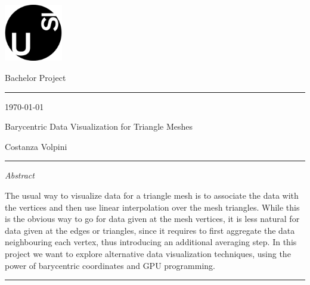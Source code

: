 \documentclass[12pt]{article}
\theoremstyle{definition}
\theoremstyle{definition}
\theoremstyle{plain}
\theoremstyle{plain}
\theoremstyle{plain}
\theoremstyle{plain}
\theoremstyle{definition}
\theoremstyle{remark}
\theoremstyle{remark}
\theoremstyle{remark}
\theoremstyle{remark}
\newcommand{\SUPERTITLE}{Bachelor Project}
\newcommand{\TITLE}{Barycentric Data Visualization for Triangle Meshes}
\newcommand{\SUBTITLE}{\color{red}{Something}\color{black}}
\newcommand{\AUTHOR}{Costanza Volpini}
\begin{document}

\thispagestyle{empty}

\includegraphics[height=2.5cm]{usi-logo.png} \vspace{-1.42cm}

\begin{flushright}
  {\large \SUPERTITLE}\vspace{-.5cm}

  \rule{0.925\textwidth}{0.4pt}\vspace{-.2cm}

  {\small \today}
\end{flushright}

\vspace{2cm} {\fontsize{20pt}{20pt}\selectfont \TITLE }

{\SUBTITLE}

\vspace{1cm} {\Large \AUTHOR}

\vspace{-.2cm}\rule{\textwidth}{0.4pt}

\textit{Abstract}

The usual way to visualize data for a triangle mesh is to associate the data with the vertices and then use linear interpolation over the mesh triangles. While this is the obvious way to go for data given at the mesh vertices, it is less natural for data given at the edges or triangles, since it requires to first aggregate the data neighbouring each vertex, thus introducing an additional averaging step.
In this project we want to explore alternative data visualization techniques, using the power of barycentric coordinates and GPU programming.


\vspace{\fill}
\rule{\textwidth}{0.4pt}
\end{document}
